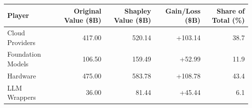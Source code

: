 

\begin{tabular}{@{}lrrrr@{}}
\toprule
Player & Original Value (\$B) & Shapley Value (\$B) & Gain/Loss (\$B) & Share of Total (\%) \\
\midrule
Cloud Providers & 417.00 & 520.14 & +103.14 & 38.7 \\
Foundation Models & 106.50 & 159.49 & +52.99 & 11.9 \\
Hardware & 475.00 & 583.78 & +108.78 & 43.4 \\
LLM Wrappers & 36.00 & 81.44 & +45.44 & 6.1 \\
\bottomrule
\end{tabular}